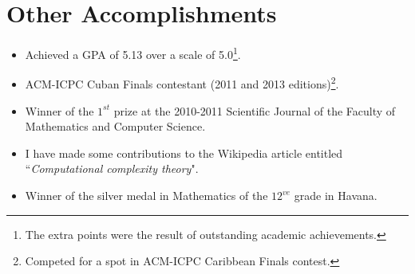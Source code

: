 \documentclass[]{friggeri-cv}
\begin{document}
\section{Other Accomplishments}
\begin{itemize}[noitemsep, nolistsep]

	\item Achieved a GPA of 5.13 over a scale of 5.0\footnote{The extra points were the result of outstanding academic achievements.}.\\

	\item ACM-ICPC Cuban Finals contestant (2011 and 2013 editions)\footnote{Competed for a spot in ACM-ICPC Caribbean Finals contest.}.\\

	\item Winner of the $1^{st}$ prize at the 2010-2011 Scientific Journal of the Faculty of Mathematics and Computer Science.\\
	
	\item I have made some contributions to the Wikipedia article entitled ``\emph{Computational complexity theory}".\\
		
	\item Winner of the silver medal in Mathematics of the $12^{ve}$ grade in Havana.\\
	
	
	
	
\end{itemize}
\end{document}
